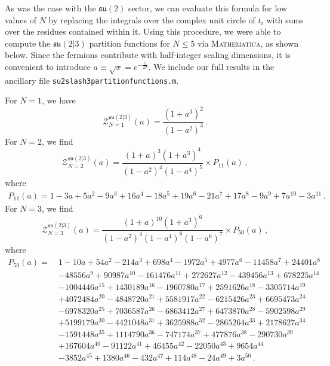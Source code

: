 \documentclass[a4paper,11pt]{article}
\begin{document}
As was the case with the $\mathfrak{su}(2)$ sector, we can evaluate this formula for low values of $N$ by replacing the integrals over the complex unit circle of $t_i$ with sums over the residues contained within it. 
% 
Using this procedure, we were able to compute the $\mathfrak{su}(2|3)$ partition functions for $N \leq 5$ via \textsc{Mathematica}, as shown below. Since the fermions contribute with half-integer scaling dimensions, it is convenient to introduce $a\equiv \sqrt{x}=e^{-\frac{1}{2T}}$.
We include our full results in the ancillary file \texttt{su2slash3partitionfunctions.m}.


For $N=1$, we have 
\begin{equation}
	\mathcal{Z}_{N=1}^{\mathfrak{su}(2|3)}(a) = \frac{(1+a^3)^2}{(1-a^2)^3} \,.
\end{equation}
For $N=2$, we find 
\begin{equation}
	\mathcal{Z}_{N=2}^{\mathfrak{su}(2|3)}(a) = \frac{(1+a)^3(1+a^3)^4}{(1-a^2)^4(1-a^4)^5} \times P_{11}(a) \, ,
\end{equation}
where 
\begin{equation}
\begin{split}
	P_{11}(a) =1-3a+5{a}^{2}-9{a}^{3}+16{a}^{4}-18{a}^{5}+19{a}^{6}
	-21{
a}^{7}+17{a}^{8}-9{a}^{9}+7{a}^{10}-3{a}^{11}
 \,.
\end{split}
\end{equation}
For $N=3$, we find 
\begin{equation}
	\mathcal{Z}_{N=3}^{\mathfrak{su}(2|3)}(a) = \frac{(1+a)^{10}(1+a^3)^6}{(1-a^2)^4(1-a^4)^8(1-a^6)^7} \times P_{50}(a) \,,
\end{equation}
% 
where
% 
\begin{equation}
\begin{split}
	P_{50}(a) =\ &1-10a+54{a}^{2}-214{a}^{3}+698{a}^{4}-1972{a}^{5}+4977{a}^{6}-11458{a}^{7}+24401{a}^{8}\\
	&-48556{a}^{9}+90987{a}^{10}-161476{a}^{11}+272627{a}^{12}-439456{a}^{13}+678225{a}^{14}\\
	&-1004446{a}^{15}+1430189{a}^{16}-1960780{a}^{17}+2591626{a}^{18}-3305714{a}^{19}\\
	&+4072484{a}^{20}-4848720{a}^{21}+5581917{a}^{22}-6215426{a}^{23}+6695473{a}^{24}\\
	&-6978320{a}^{25}+7036587{a}^{26}-6863412{a}^{27}+6473870{a}^{28}-5902598{a}^{29}\\
	&+5199179{a}^{30}-4421048{a}^{31}+3625988{a}^{32}-2865264{a}^{33}+2178627{a}^{34}\\
	&-1591448{a}^{35}+1114790{a}^{36}-747174{a}^{37}+477876{a}^{38}-290730{a}^{39}\\
	&+167604{a}^{40}-91122{a}^{41}+46455{a}^{42}-22050{a}^{43}+9654{a}^{44}\\
	&-3852{a}^{45}+1380{a}^{46}-432{a}^{47}+114{a}^{48}-24{a}^{49}+3{a}^{50}
 \,.
\end{split}
\end{equation}
\end{document}
